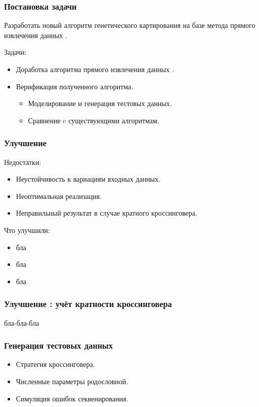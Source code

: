 \documentclass{beamer}
\begin{document}
\begin{frame}
  \frametitle{Постановка задачи}
  Разработать новый алгоритм генетического картирования на базе метода
  прямого извлечения данных \genmap.

  \medskip

  Задачи:
  \begin{itemize}
  \item Доработка алгоритма прямого извлечения данных \genmap.
  \item Верификация полученного алгоритма.
    \begin{itemize}
    \item Моделирование и генерация тестовых данных.
    \item Сравнение c существующими алгоритмам.
    \end{itemize}
  \end{itemize}
\end{frame}

\begin{frame}
  \frametitle{Улучшение \genmap}

  Недостатки:
  \begin{itemize}
  \item Неустойчивость к вариациям входных данных.
  \item Неоптимальная реализация.
  \item Неправильный результат в случае кратного кроссинговера.
  \end{itemize}

  Что улучшили:
  \begin{itemize}
  \item бла
  \item бла
  \item бла
  \end{itemize}
\end{frame}

\begin{frame}
  \frametitle{Улучшение \genmap: учёт кратности кроссинговера}
  бла-бла-бла
\end{frame}

\begin{frame}
  \frametitle{Генерация тестовых данных}
  \begin{itemize}
  \item Стратегия кроссинговера.
  \item Численные параметры родословной.
  \item Симуляция ошибок секвенирования.
  \end{itemize}
\end{frame}
\end{document}
